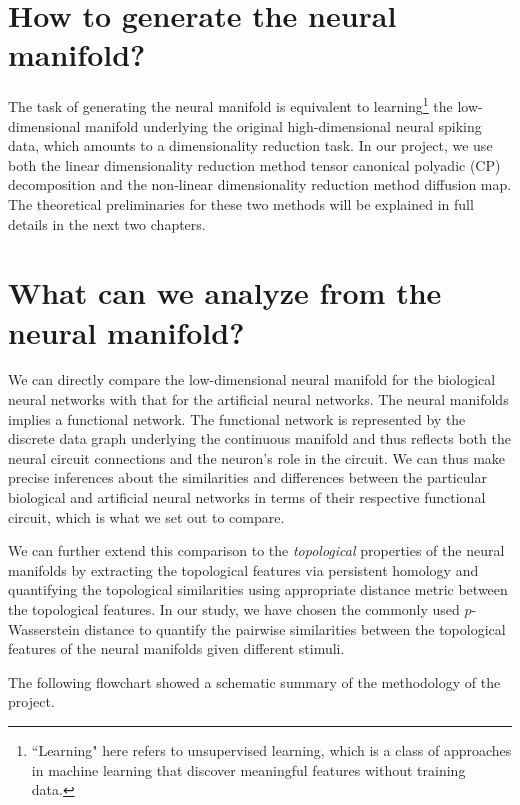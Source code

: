 \section{How to generate the neural manifold?}
The task of generating the neural manifold is equivalent to learning\footnote{``Learning" here refers to unsupervised learning, which is a class of approaches in machine learning that discover meaningful features without training data.} the low-dimensional manifold underlying the original high-dimensional neural spiking data, which amounts to a dimensionality reduction task. In our project, we use both the linear dimensionality reduction method tensor canonical polyadic (CP) decomposition and the non-linear dimensionality reduction method diffusion map. The theoretical preliminaries for these two methods will be explained in full details in the next two chapters.

\section{What can we analyze from the neural manifold?}

We can directly compare the low-dimensional neural manifold for the biological neural networks with that for the artificial neural networks. The neural manifolds implies a functional network. The functional network is represented by the discrete data graph underlying the continuous manifold and thus reflects both the neural circuit connections and the neuron’s role in the circuit. We can thus make precise inferences about the similarities and differences between the particular biological and artificial neural networks in terms of their respective functional circuit, which is what we set out to compare. 


We can further extend this comparison to the \textit{topological} properties of the neural manifolds by extracting the topological features via persistent homology and quantifying the topological similarities using appropriate distance metric between the topological features. In our study, we have chosen the commonly used $p$-Wasserstein distance to quantify the pairwise similarities between the topological features of the neural manifolds given different stimuli. 

The following flowchart showed a schematic summary of the methodology of the project.

\bigskip

